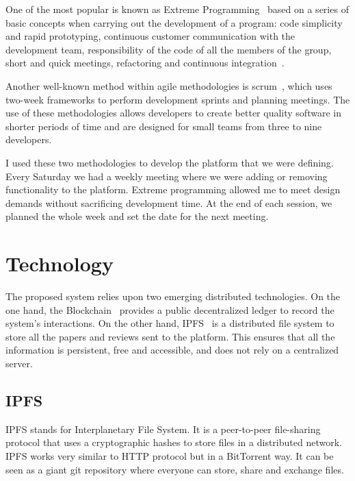 One of the most popular is known as Extreme
Programming~\cite{lindstrom2004extreme} based on a series of basic concepts when
carrying out the development of a program: code simplicity and rapid
prototyping, continuous customer communication with the development team,
responsibility of the code of all the members of the group, short and quick
meetings, refactoring and continuous integration~\cite{theunissen2005search}.

Another well-known method within agile methodologies is
scrum~\cite{rising2000scrum}, which uses two-week frameworks to perform
development sprints and planning meetings. The use of these methodologies allows
developers to create better quality software in shorter periods of time and are
designed for small teams from three to nine developers.

I used these two methodologies to develop the platform that we were defining.
Every Saturday we had a weekly meeting where we were adding or removing
functionality to the platform. Extreme programming allowed me to meet design
demands without sacrificing development time. At the end of each session, we
planned the whole week and set the date for the next meeting.

\section{Technology}
\label{tech}

The proposed system relies upon two emerging distributed technologies. On the
one hand, the Blockchain~\cite{buterin2014ethereum} provides a public
decentralized ledger to record the system's interactions. On the other hand,
IPFS~\cite{benet_ipfs-content_2014} is a distributed file system to store all
the papers and reviews sent to the platform. This ensures that all the
information is persistent, free and accessible, and does not rely on a
centralized server.

\subsection{IPFS}
\label{tech:sec:ipfs}
IPFS stands for Interplanetary File System. It is a peer-to-peer file-sharing
protocol that uses a cryptographic hashes to store files in a distributed
network. IPFS works very similar to HTTP protocol but in a BitTorrent way. It
can be seen as a giant git repository where everyone can store, share and
exchange files\cite{benet2014ipfs}.


